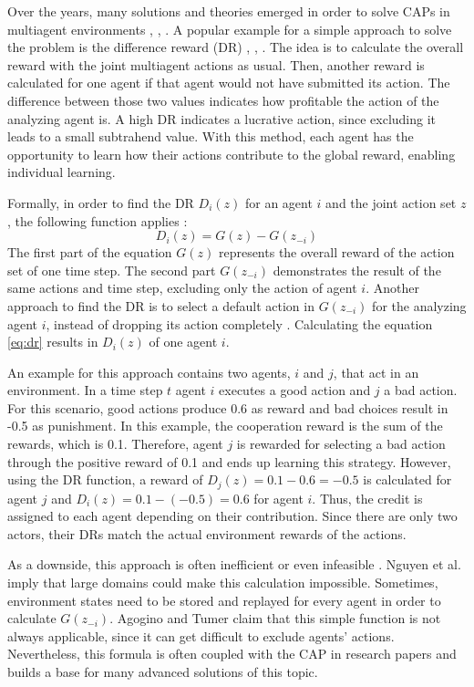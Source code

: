 Over the years, many solutions and theories emerged in order to solve CAPs in multiagent environments \cite{rabe09}, \cite{zhli20}, \cite{agtu04}. A popular example for a simple approach to solve the problem is the difference reward (DR) \cite{ngku18}, \cite{yltu14}, \cite{agtu04}. The idea is to calculate the overall reward with the joint multiagent actions as usual. Then, another reward is calculated for one agent if that agent would not have submitted its action. The difference between those two values indicates how profitable the action of the analyzing agent is. A high DR indicates a lucrative action, since excluding it leads to a small subtrahend value. With this method, each agent has the opportunity to learn how their actions contribute to the global reward, enabling individual learning. 

Formally, in order to find the DR $D_i(z)$ for an agent $i$ and the joint action set $z$, the following function applies \cite{agtu04}:
\begin{equation}\label{eq:dr}
    D_i(z) = G(z) - G(z_{-i})
\end{equation}
The first part of the equation $G(z)$ represents the overall reward of the action set of one time step. The second part $G(z_{-i})$ demonstrates the result of the same actions and time step, excluding only the action of agent $i$. Another approach to find the DR is to select a default action in $G(z_{-i})$ for the analyzing agent $i$, instead of dropping its action completely \cite{vega96}. Calculating the equation \eqref{eq:dr} results in $D_i(z)$ of one agent $i$. 

An example for this approach contains two agents, $i$ and $j$, that act in an environment. In a time step $t$ agent $i$ executes a good action and $j$ a bad action. For this scenario, good actions produce 0.6 as reward and bad choices result in -0.5 as punishment. In this example, the cooperation reward is the sum of the rewards, which is 0.1. Therefore, agent $j$ is rewarded for selecting a bad action through the positive reward of 0.1 and ends up learning this strategy. However, using the DR function, a reward of $D_j(z) = 0.1 - 0.6 = -0.5$ is calculated for agent $j$ and $D_i(z) = 0.1 - (-0.5) = 0.6$ for agent $i$. Thus, the credit is assigned to each agent depending on their contribution. Since there are only two actors, their DRs match the actual environment rewards of the actions.

As a downside, this approach is often inefficient or even infeasible \cite{ngku18}. Nguyen et al. \cite{ngku18} imply that large domains could make this calculation impossible. Sometimes, environment states need to be stored and replayed for every agent in order to calculate $G(z_{-i})$. Agogino and Tumer \cite{agtu04} claim that this simple function is not always applicable, since it can get difficult to exclude agents' actions. Nevertheless, this formula is often coupled with the CAP in research papers and builds a base for many advanced solutions of this topic.

